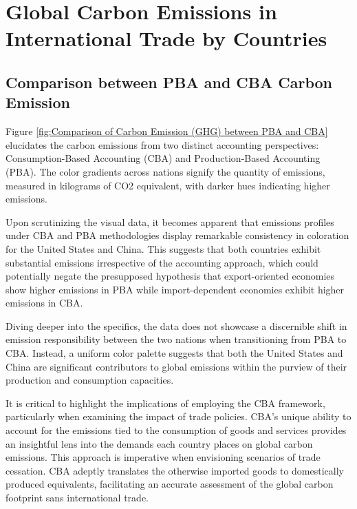 \section{Global Carbon Emissions in International Trade by Countries}

\subsection{Comparison between PBA and CBA Carbon Emission}
Figure \ref{fig:Comparison of Carbon Emission (GHG) between PBA and CBA} elucidates the carbon emissions from two distinct accounting perspectives: Consumption-Based Accounting (CBA) and Production-Based Accounting (PBA). The color gradients across nations signify the quantity of emissions, measured in kilograms of CO2 equivalent, with darker hues indicating higher emissions.

Upon scrutinizing the visual data, it becomes apparent that emissions profiles under CBA and PBA methodologies display remarkable consistency in coloration for the United States and China. This suggests that both countries exhibit substantial emissions irrespective of the accounting approach, which could potentially negate the presupposed hypothesis that export-oriented economies show higher emissions in PBA while import-dependent economies exhibit higher emissions in CBA.

Diving deeper into the specifics, the data does not showcase a discernible shift in emission responsibility between the two nations when transitioning from PBA to CBA. Instead, a uniform color palette suggests that both the United States and China are significant contributors to global emissions within the purview of their production and consumption capacities.

It is critical to highlight the implications of employing the CBA framework, particularly when examining the impact of trade policies. CBA's unique ability to account for the emissions tied to the consumption of goods and services provides an insightful lens into the demands each country places on global carbon emissions. This approach is imperative when envisioning scenarios of trade cessation. CBA adeptly translates the otherwise imported goods to domestically produced equivalents, facilitating an accurate assessment of the global carbon footprint sans international trade.

